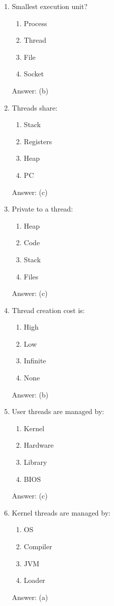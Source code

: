 \begin{enumerate}
\item Smallest execution unit?
\begin{enumerate}[label=(\alph*)]
\item Process
\item Thread
\item File
\item Socket
\end{enumerate}
Answer: (b)

\item Threads share:
\begin{enumerate}[label=(\alph*)]
\item Stack
\item Registers
\item Heap
\item PC
\end{enumerate}
Answer: (c)

\item Private to a thread:
\begin{enumerate}[label=(\alph*)]
\item Heap
\item Code
\item Stack
\item Files
\end{enumerate}
Answer: (c)

\item Thread creation cost is:
\begin{enumerate}[label=(\alph*)]
\item High
\item Low
\item Infinite
\item None
\end{enumerate}
Answer: (b)

\item User threads are managed by:
\begin{enumerate}[label=(\alph*)]
\item Kernel
\item Hardware
\item Library
\item BIOS
\end{enumerate}
Answer: (c)

\item Kernel threads are managed by:
\begin{enumerate}[label=(\alph*)]
\item OS
\item Compiler
\item JVM
\item Loader
\end{enumerate}
Answer: (a)


\end{enumerate}
